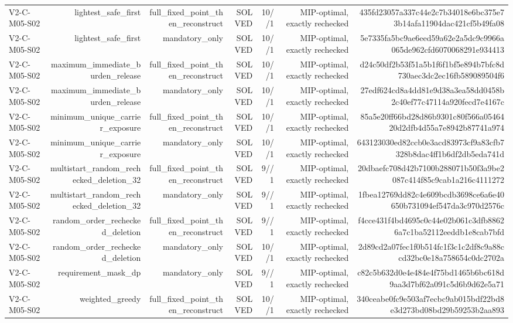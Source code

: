{\begin{longtable}{lrrrrrr}
V2-C-M05-S02 & lightest\_safe\_first & full\_fixed\_point\_then\_reconstruct & SOLVED & 10//1 & MIP-optimal, exactly rechecked & 435fd23057a337c44e2c7b34018e6bc375e73b14afa11904dac421cf5b49fa08 \\
V2-C-M05-S02 & lightest\_safe\_first & mandatory\_only & SOLVED & 10//1 & MIP-optimal, exactly rechecked & 5e7335fa5bc9ae6eed59a62e2a5dc9c9966a065de962cfd6070068291e934413 \\
V2-C-M05-S02 & maximum\_immediate\_burden\_release & full\_fixed\_point\_then\_reconstruct & SOLVED & 10//1 & MIP-optimal, exactly rechecked & d24c50df2b53f51a5b1f6f1bf5e894b7bfc8d730aec3dc2ec16fb589089504f6 \\
V2-C-M05-S02 & maximum\_immediate\_burden\_release & mandatory\_only & SOLVED & 10//1 & MIP-optimal, exactly rechecked & 27edf624cd8a4dd81e9d38a3ea58dd0458b2c40ef77c47114a920fecd7e4167c \\
V2-C-M05-S02 & minimum\_unique\_carrier\_exposure & full\_fixed\_point\_then\_reconstruct & SOLVED & 10//1 & MIP-optimal, exactly rechecked & 85a5e20ff66bd28d86b9301c80f566a0546420d2dfb4d55a7e8942b87741a974 \\
V2-C-M05-S02 & minimum\_unique\_carrier\_exposure & mandatory\_only & SOLVED & 10//1 & MIP-optimal, exactly rechecked & 643123030ed82ccb0e3acd83973cf9a83cfb7328b8dac4ff1b6df2db5eda741d \\
V2-C-M05-S02 & multistart\_random\_rechecked\_deletion\_32 & full\_fixed\_point\_then\_reconstruct & SOLVED & 9//1 & MIP-optimal, exactly rechecked & 20dbaefc708d42b7100b288071b50f3a9be2087c414f85c9cab1a216c4111272 \\
V2-C-M05-S02 & multistart\_random\_rechecked\_deletion\_32 & mandatory\_only & SOLVED & 9//1 & MIP-optimal, exactly rechecked & 1fbea12769dd82c4e609bcdb3698ce6a6e40650b731094ef547da3c970d2576c \\
V2-C-M05-S02 & random\_order\_rechecked\_deletion & full\_fixed\_point\_then\_reconstruct & SOLVED & 9//1 & MIP-optimal, exactly rechecked & f4cce431f4bd4695c0c44e02b061c3dfb88626a7c1ba52112eeddb1e8cab7bfd \\
V2-C-M05-S02 & random\_order\_rechecked\_deletion & mandatory\_only & SOLVED & 10//1 & MIP-optimal, exactly rechecked & 2d89cd2a07fec1f0b514fc1f3c1c2df8c9a88ccd32bc0e18a758654c0dc2702a \\
V2-C-M05-S02 & requirement\_mask\_dp & mandatory\_only & SOLVED & 9//1 & MIP-optimal, exactly rechecked & c82c5b632d0e4e484e4f75bd1465b6bc618d9aa3d7bf62a091c5d6b9d62e5a71 \\
V2-C-M05-S02 & weighted\_greedy & full\_fixed\_point\_then\_reconstruct & SOLVED & 10//1 & MIP-optimal, exactly rechecked & 340ceabe0fc9e503af7ecbc9ab015bdf22bd8e3d273bd08bd29b59253b2aa893 \\

\end{longtable}}
